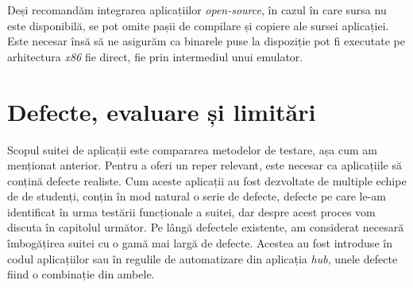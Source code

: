 Deși recomandăm integrarea aplicațiilor \textit{open-source}, în cazul în care sursa nu este disponibilă, se pot omite pașii de compilare și copiere ale sursei aplicației. Este necesar însă să ne asigurăm ca binarele puse la dispoziție pot fi executate pe arhitectura \textit{x86} fie direct, fie prin intermediul unui emulator.

\section{Defecte, evaluare și limitări}

Scopul suitei de aplicații este compararea metodelor de testare, așa cum am menționat anterior. Pentru a oferi un reper relevant, este necesar ca aplicațiile să conțină defecte realiste. Cum aceste aplicații au fost dezvoltate de multiple echipe de de studenți, conțin în mod natural o serie de defecte, defecte pe care le-am identificat în urma testării funcționale a suitei, dar despre acest proces vom discuta în capitolul următor. Pe lângă defectele existente, am considerat necesară îmbogățirea suitei cu o gamă mai largă de defecte. Acestea au fost introduse în codul aplicațiilor sau în regulile de automatizare din aplicația \textit{hub}, unele defecte fiind o combinație din ambele.

